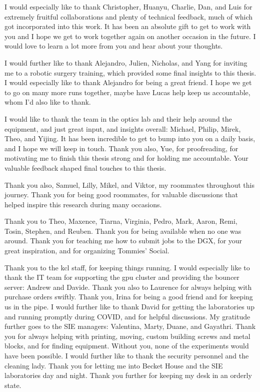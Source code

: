 I would especially like to thank Christopher, Huanyu, Charlie, Dan, and Luis for extremely fruitful collaborations and plenty of technical feedback, much of which got incorporated into this work. It has been an absolute gift to get to work with you and I hope we get to work together again on another occasion in the future. I would love to learn a lot more from you and hear about your thoughts.

I would further like to thank Alejandro, Julien, Nicholas, and Yang for inviting me to a robotic surgery training, which provided some final insights to this thesis. I would especially like to thank Alejandro for being a great friend. I hope we get to go on many more runs together, maybe have Lucas help keep us accountable, whom I'd also like to thank.

I would like to thank the team in the optics lab and their help around the equipment, and just great input, and insights overall: Michael, Philip, Mirek, Theo, and Yijing. It has been incredible to get to bump into you on a daily basis, and I hope we will keep in touch. Thank you also, Yue, for proofreading, for motivating me to finish this thesis strong and for holding me accountable. Your valuable feedback shaped final touches to this thesis.

Thank you also, Samuel, Lilly, Mikel, and Viktor, my roommates throughout this journey. Thank you for being good roommates, for valuable discussions that helped inspire this research during many occasions.

Thank you to Theo, Maxence, Tiarna, Virginia, Pedro, Mark, Aaron, Remi, Tosin, Stephen, and Reuben. Thank you for being available when no one was around. Thank you for teaching me how to submit jobs to the DGX, for your great inspiration, and for organizing Tommies' Social.

Thank you to the \gls{kcl} staff, for keeping things running. I would especially like to thank the IT team for supporting the \gls{gpu} cluster and providing the bouncer server: Andrew and Davide. Thank you also to Laurence for always helping with purchase orders swiftly. Thank you, Irina for being a good friend and for keeping us in the pipe. I would further like to thank David for getting the laboratories up and running promptly during COVID, and for helpful discussions. My gratitude further goes to the SIE managers: Valentina, Marty, Duane, and Gayathri. Thank you for always helping with printing, moving, custom building screws and metal blocks, and for finding equipment. Without you, none of the experiments would have been possible. I would further like to thank the security personnel and the cleaning lady. Thank you for letting me into Becket House and the SIE laboratories day and night. Thank you further for keeping my desk in an orderly state.

